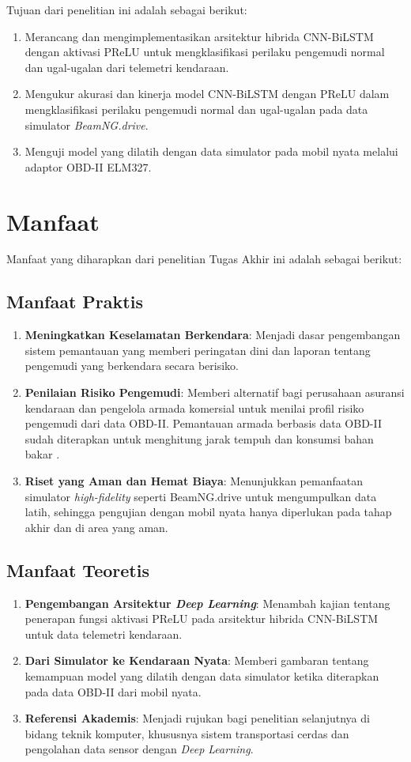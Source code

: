 Tujuan dari penelitian ini adalah sebagai berikut:
\begin{enumerate}
    \item Merancang dan mengimplementasikan arsitektur hibrida CNN-BiLSTM dengan aktivasi PReLU untuk mengklasifikasi perilaku pengemudi normal dan ugal-ugalan dari telemetri kendaraan.
    \item Mengukur akurasi dan kinerja model CNN-BiLSTM dengan PReLU dalam mengklasifikasi perilaku pengemudi normal dan ugal-ugalan pada data simulator \textit{BeamNG.drive}.
    \item Menguji model yang dilatih dengan data simulator pada mobil nyata melalui adaptor OBD-II ELM327.
\end{enumerate}

\section{Manfaat}

Manfaat yang diharapkan dari penelitian Tugas Akhir ini adalah sebagai berikut:

\subsection{Manfaat Praktis}
\begin{enumerate}[label=\arabic*.]
  \item \textbf{Meningkatkan Keselamatan Berkendara}: Menjadi dasar pengembangan sistem pemantauan yang memberi peringatan dini dan laporan tentang pengemudi yang berkendara secara berisiko.
  \item \textbf{Penilaian Risiko Pengemudi}: Memberi alternatif bagi perusahaan asuransi kendaraan dan pengelola armada komersial untuk menilai profil risiko pengemudi dari data OBD-II. Pemantauan armada berbasis data OBD-II sudah diterapkan untuk menghitung jarak tempuh dan konsumsi bahan bakar \cite{Malekian2017}.
  \item \textbf{Riset yang Aman dan Hemat Biaya}: Menunjukkan pemanfaatan simulator \textit{high-fidelity} seperti BeamNG.drive untuk mengumpulkan data latih, sehingga pengujian dengan mobil nyata hanya diperlukan pada tahap akhir dan di area yang aman.
\end{enumerate}

\subsection{Manfaat Teoretis}
\begin{enumerate}[label=\arabic*.]
  \item \textbf{Pengembangan Arsitektur \textit{Deep Learning}}: Menambah kajian tentang penerapan fungsi aktivasi PReLU pada arsitektur hibrida CNN-BiLSTM untuk data telemetri kendaraan.
  \item \textbf{Dari Simulator ke Kendaraan Nyata}: Memberi gambaran tentang kemampuan model yang dilatih dengan data simulator ketika diterapkan pada data OBD-II dari mobil nyata.
  \item \textbf{Referensi Akademis}: Menjadi rujukan bagi penelitian selanjutnya di bidang teknik komputer, khususnya sistem transportasi cerdas dan pengolahan data sensor dengan \textit{Deep Learning}.
\end{enumerate}

